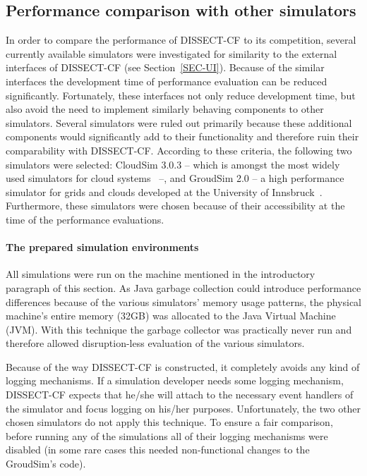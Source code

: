 \documentclass[sort, compress, 5p]{elsarticle}
\begin{document}
\subsection{Performance comparison with other simulators}

In order to compare the performance of DISSECT-CF to its competition, several currently available simulators were investigated for similarity to the external interfaces of DISSECT-CF (see Section~\ref{SEC-UI}). Because of the similar interfaces the development time of performance evaluation can be reduced significantly. Fortunately, these interfaces not only reduce development time, but also avoid the need to implement similarly behaving components to other simulators. Several simulators were ruled out primarily because these additional components would significantly add to their functionality and therefore ruin their comparability with DISSECT-CF. According to these criteria, the following two simulators were selected:  CloudSim 3.0.3 -- which is amongst the most widely used simulators for cloud systems~\cite{CloudSim-buyya2009modeling} --, and  GroudSim 2.0 -- a high performance simulator for grids and clouds developed at the University of Innsbruck~\cite{GroudSim-ostermann2011groudsim}. Furthermore, these simulators were chosen because of their accessibility at the time of the performance evaluations.

\paragraph{The prepared simulation environments} All simulations were run on the machine mentioned in the introductory paragraph of this section. As Java garbage collection could introduce performance differences because of the various simulators' memory usage patterns, the physical machine's entire memory (32GB) was allocated to the Java Virtual Machine (JVM). With this technique the garbage collector was practically never run and therefore allowed disruption-less evaluation of the various simulators.

Because of the way DISSECT-CF is constructed, it completely avoids any kind of logging mechanisms. If a simulation developer needs some logging mechanism, DISSECT-CF expects that he/she will attach to the necessary event handlers of the simulator and focus logging on his/her purposes. Unfortunately, the two other chosen simulators do not apply this technique. To ensure a fair comparison, before running any of the simulations all of their logging mechanisms were disabled (in some rare cases this needed non-functional changes to the GroudSim's code).
\end{document}
